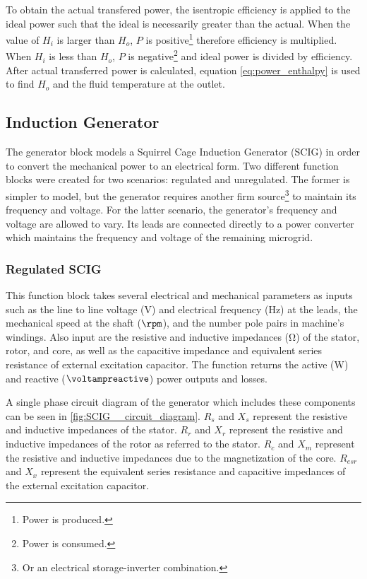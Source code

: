 To obtain the actual transfered power, the isentropic efficiency is applied to the ideal power such that the ideal is necessarily greater than the actual. When the value of $H_i$ is larger than $H_o$, $P$ is positive\footnote{Power is produced.} therefore efficiency is multiplied. When $H_i$ is less than $H_o$, $P$ is negative\footnote{Power is consumed.} and ideal power is divided by efficiency. After actual transferred power is calculated, equation \ref{eq:power_enthalpy} is used to find $H_o$ and the fluid temperature at the outlet.

\subsection{Induction Generator}
The generator block models a Squirrel Cage Induction Generator (SCIG) in order to convert the mechanical power to an electrical form. Two different function blocks were created for two scenarios: regulated and unregulated. The former is simpler to model, but the generator requires another firm source\footnote{Or an electrical storage-inverter combination.} to maintain its frequency and voltage. For the latter scenario, the generator's frequency and voltage are allowed to vary. Its leads are connected directly to a power converter which maintains the frequency and voltage of the remaining microgrid. 

\subsubsection{Regulated SCIG}
This function block takes several electrical and mechanical parameters as inputs such as the line to line voltage ($\si{\volt}$) and electrical frequency ($\si{\hertz}$) at the leads, the mechanical speed at the shaft ($\si{\rpm}$), and the number pole pairs in machine's windings. Also input are the resistive and inductive impedances ($\si{\ohm}$) of the stator, rotor, and core, as well as the capacitive impedance and equivalent series resistance of external excitation capacitor. The function returns the active ($\si{\watt}$) and reactive ($\si{\voltampreactive}$) power outputs and losses.


A single phase circuit diagram of the generator which includes these components can be seen in \autoref{fig:SCIG__circuit_diagram}. $R_s$ and $X_s$ represent the resistive and inductive impedances of the stator. $R_r$ and $X_r$ represent the resistive and inductive impedances of the rotor as referred to the stator. $R_c$ and $X_m$ represent the resistive and inductive impedances due to the magnetization of the core. $R_{esr}$ and $X_x$ represent the equivalent series resistance and capacitive impedances of the external excitation capacitor.

